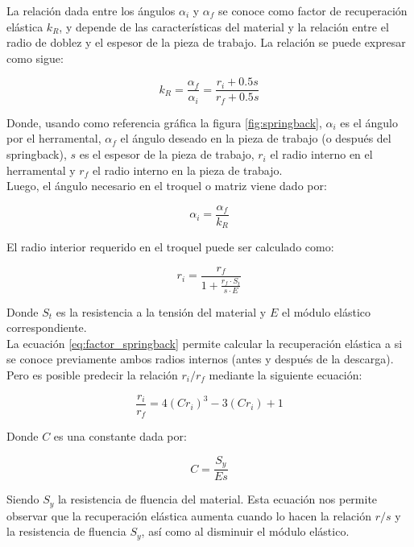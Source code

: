 La relación dada entre los ángulos $\alpha_i$ y $\alpha_f$ se conoce como factor de recuperación elástica $k_R$, 
y depende de las características del material y la relación entre el radio de doblez y el espesor de la 
pieza de trabajo. La relación se puede expresar como sigue: ~\cite{schuler1998}

\begin{equation}\label{eq:factor_springback}
k_R = \frac{\alpha_f}{\alpha_i} = \frac{r_{i} + 0.5 s}{r_{f} + 0.5 s}
\end{equation}

Donde, usando como referencia gráfica la figura \ref{fig:springback}, $\alpha_i$ es el ángulo por el 
herramental, $\alpha_f$ el ángulo deseado en la pieza de trabajo (o después del springback), 
$s$ es el espesor de la pieza de trabajo, $r_{i}$ el radio interno en el herramental y $r_{f}$ el 
radio interno en la pieza de trabajo.\\

Luego, el ángulo necesario en el troquel o matriz viene dado por:

\begin{equation}
\alpha_i = \frac{\alpha_f}{k_R}
\end{equation}

El radio interior requerido en el troquel puede ser calculado como:

\begin{equation}
r_{i} = \frac{r_{f}}{1+\frac{r_{f} \cdot S_t}{s \cdot E}}
\end{equation}

Donde $S_t$ es la resistencia a la tensión del material y $E$ el módulo elástico correspondiente.\\

La ecuación \ref{eq:factor_springback} permite calcular la recuperación elástica a si se conoce 
previamente ambos radios internos (antes y después de la descarga). Pero es posible 
predecir la relación $r_i/r_f$ mediante la siguiente ecuación: ~\cite{kalpakjian2008}

\begin{equation}
\frac{r_i}{r_f} = 4 \left( C r_i\right)^3 - 3 \left( C r_i \right) + 1
\end{equation}

Donde $C$ es una constante dada por:

\begin{equation}
C = \frac{S_y}{Es}
\end{equation}

Siendo $S_y$ la resistencia de fluencia del material. Esta ecuación nos permite observar 
que la recuperación elástica aumenta cuando lo hacen la relación $r/s$ y la 
resistencia de fluencia $S_y$, así como al disminuir el módulo elástico.


